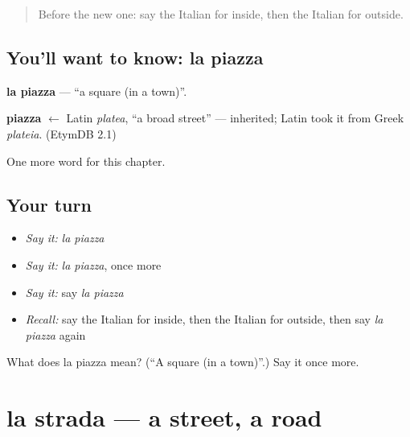 \label{lesson:IT-C80-piazza}



\begin{quote}
Before the new one: say the Italian for inside, then the Italian for outside.
\end{quote}

\subsection*{You'll want to know: la piazza}
\textbf{la piazza} — \textquotedblleft{}a square (in a town)\textquotedblright{}.

\begin{cousinweb}
\textbf{piazza} $\leftarrow$ Latin \emph{platea}, \textquotedblleft{}a broad street\textquotedblright{} — inherited; Latin took it from Greek \emph{plateia}. (EtymDB 2.1)
\end{cousinweb}

\begin{grammarlens}[title={What you've built}]
One more word for this chapter.
\end{grammarlens}

\subsection*{Your turn}
\begin{itemize}
\raggedright
  \item \emph{Say it:} \emph{la piazza}
  \item \emph{Say it:} \emph{la piazza}, once more
  \item \emph{Say it:} say \emph{la piazza}
  \item \emph{Recall:} say the Italian for inside, then the Italian for outside, then say \emph{la piazza} again
\end{itemize}

\begin{tcolorbox}[breakable,colback=teal!4,colframe=teal!35!black,title={Before you move on}]
What does la piazza mean? (\textquotedblleft{}A square (in a town)\textquotedblright{}.) Say it once more.
\end{tcolorbox}
\section[la strada]{la strada — a street, a road}

\label{lesson:IT-C80-strada}



